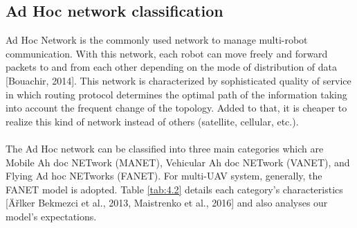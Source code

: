 \documentclass[11pt,openany]{book}
\begin{document}
\subsection{Ad Hoc network classification}
Ad Hoc Network is the commonly used network to manage multi-robot communication. With this network, each robot can move freely and forward packets to and from each other depending on the mode of distribution of data [Bouachir, 2014]. This network is characterized by sophisticated quality of service in which routing protocol determines the optimal path of the information taking into account the frequent change of the topology. Added to that, it is cheaper to realize this kind of network instead of others (satellite, cellular, etc.).\\\\
The Ad Hoc network can be classiﬁed into three main categories which are Mobile Ah doc NETwork (MANET), Vehicular Ah doc NETwork (VANET), and Flying Ad hoc NETworks (FANET). For multi-UAV system, generally, the FANET model is adopted. Table \ref{tab:4.2} details each category’s characteristics [Äřlker Bekmezci et al., 2013, Maistrenko et al., 2016] and also analyses our model’s expectations.
\end{document}
